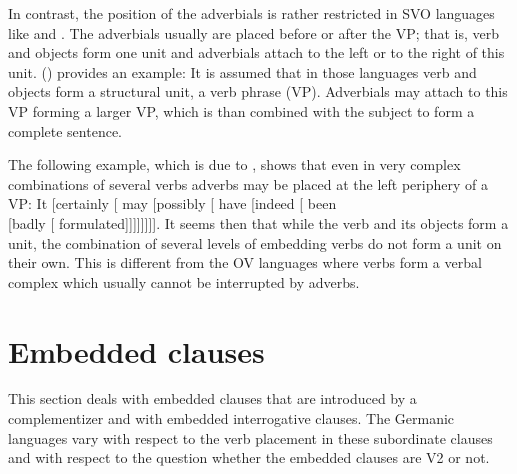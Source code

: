 In contrast, the position of the adverbials is rather restricted in SVO languages like  and
. The adverbials usually are placed before or after the VP; that is, verb and objects form one
unit and adverbials attach to the left or to the right of this unit. () provides an example:
\eal
{}
\zl
It is assumed that in those languages verb and objects form a structural unit, a verb phrase (VP). Adverbials may
attach to this VP forming a larger VP, which is than combined with the subject to form a complete sentence.

The following example, which is due to \citet[§ 8.20, 495]{QGLS85a-u}, shows that even in very
complex combinations of several verbs adverbs may be placed at the left periphery of a VP:
\ea
It [certainly [ may [possibly [ have [indeed [ been\\ {}[badly [ formulated]]]]]]]].
\z
It seems then that while the verb and its objects form a unit, the combination of several levels of embedding verbs do not form a unit on their own. 
This is different from the OV languages where verbs form a verbal complex which usually cannot be
interrupted by adverbs.
\eal
{}
\zl

\section{Embedded clauses}
\label{sec-embeeded-clauses}

This section deals with embedded clauses that are introduced by a complementizer and with
embedded interrogative clauses. The Germanic languages vary with respect to the verb placement in
these subordinate clauses and with respect to the question whether the embedded clauses are V2 or not.

